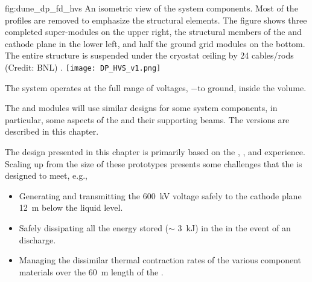 \begin{dunefigure}{fig:dune_dp_fd_hvs}
{An isometric view of the   system components. Most of the  profiles are removed to emphasize the structural elements.  The figure shows three completed  super-modules on the upper right, the structural members of the  and cathode plane in the lower left, and half the ground grid modules on the bottom.  The entire structure is suspended under the cryostat ceiling by 24 cables/rods (Credit: BNL) }.
\texttt{[image: DP\_HVS\_v1.png]}
\end{dunefigure}

The system operates at the full range of voltages, 
$-$\dptargetdriftvoltpos to ground, inside the  volume. 

The \single and \dual modules will use similar designs for some  system components, 
in particular, some aspects of the  and their supporting beams. The  versions are described in this chapter. 

The design presented in this chapter is primarily based on the , , and  experience. Scaling up from the size of these  prototypes presents some challenges that the  is designed to meet, e.g., 


\begin{itemize}
    \item Generating and transmitting the \SI{600}{\kV} voltage safely to the cathode plane \SI{12}{\m} below the liquid level.
    \item Safely dissipating all the energy stored ($\sim$ \SI{3}{\kJ}) in the %
     in the event of an  discharge.
    \item Managing the dissimilar thermal contraction rates of the various component %
    materials over the \SI{60}{\m} length of the .
\end{itemize}

